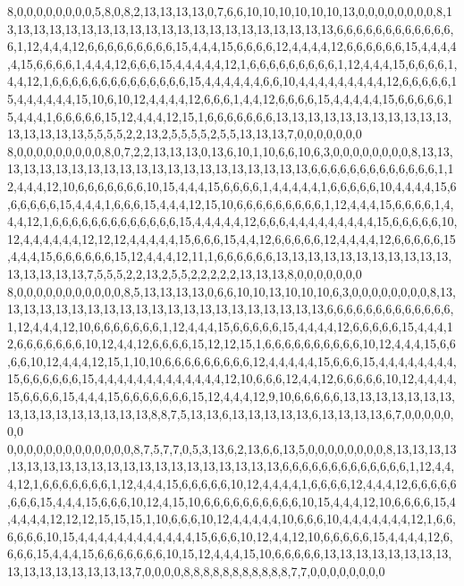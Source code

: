 8,0,0,0,0,0,0,0,0,5,8,0,8,2,13,13,13,13,0,7,6,6,10,10,10,10,10,10,13,0,0,0,0,0,0,0,0,8,13,13,13,13,13,13,13,13,13,13,13,13,13,13,13,13,13,13,13,13,13,6,6,6,6,6,6,6,6,6,6,6,6,6,1,12,4,4,4,12,6,6,6,6,6,6,6,6,6,15,4,4,4,15,6,6,6,6,12,4,4,4,4,12,6,6,6,6,6,6,15,4,4,4,4,4,15,6,6,6,6,1,4,4,4,12,6,6,6,15,4,4,4,4,4,12,1,6,6,6,6,6,6,6,6,6,1,12,4,4,4,15,6,6,6,6,1,4,4,12,1,6,6,6,6,6,6,6,6,6,6,6,6,6,6,15,4,4,4,4,4,4,6,6,10,4,4,4,4,4,4,4,4,4,12,6,6,6,6,6,15,4,4,4,4,4,4,15,10,6,10,12,4,4,4,4,12,6,6,6,1,4,4,12,6,6,6,6,15,4,4,4,4,4,15,6,6,6,6,6,15,4,4,4,1,6,6,6,6,6,15,12,4,4,4,12,15,1,6,6,6,6,6,6,6,13,13,13,13,13,13,13,13,13,13,13,13,13,13,13,13,5,5,5,5,2,2,13,2,5,5,5,5,2,5,5,13,13,13,7,0,0,0,0,0,0,0
8,0,0,0,0,0,0,0,0,0,8,0,7,2,2,13,13,13,0,13,6,10,1,10,6,6,10,6,3,0,0,0,0,0,0,0,0,8,13,13,13,13,13,13,13,13,13,13,13,13,13,13,13,13,13,13,13,13,13,6,6,6,6,6,6,6,6,6,6,6,6,6,1,12,4,4,4,12,10,6,6,6,6,6,6,6,10,15,4,4,4,15,6,6,6,6,1,4,4,4,4,4,1,6,6,6,6,6,10,4,4,4,4,15,6,6,6,6,6,6,15,4,4,4,1,6,6,6,15,4,4,4,12,15,10,6,6,6,6,6,6,6,6,6,1,12,4,4,4,15,6,6,6,6,1,4,4,4,12,1,6,6,6,6,6,6,6,6,6,6,6,6,6,15,4,4,4,4,4,12,6,6,6,4,4,4,4,4,4,4,4,4,15,6,6,6,6,6,10,12,4,4,4,4,4,4,12,12,12,4,4,4,4,4,15,6,6,6,15,4,4,12,6,6,6,6,6,12,4,4,4,4,12,6,6,6,6,6,15,4,4,4,15,6,6,6,6,6,6,15,12,4,4,4,12,11,1,6,6,6,6,6,6,13,13,13,13,13,13,13,13,13,13,13,13,13,13,13,13,7,5,5,5,2,2,13,2,5,5,2,2,2,2,2,13,13,13,8,0,0,0,0,0,0,0
8,0,0,0,0,0,0,0,0,0,0,0,8,5,13,13,13,13,0,6,6,10,10,13,10,10,10,6,3,0,0,0,0,0,0,0,0,8,13,13,13,13,13,13,13,13,13,13,13,13,13,13,13,13,13,13,13,13,13,6,6,6,6,6,6,6,6,6,6,6,6,6,1,12,4,4,4,12,10,6,6,6,6,6,6,6,1,12,4,4,4,15,6,6,6,6,6,15,4,4,4,4,12,6,6,6,6,6,15,4,4,4,12,6,6,6,6,6,6,6,10,12,4,4,12,6,6,6,6,15,12,12,15,1,6,6,6,6,6,6,6,6,6,6,10,12,4,4,4,15,6,6,6,6,10,12,4,4,4,12,15,1,10,10,6,6,6,6,6,6,6,6,6,12,4,4,4,4,4,15,6,6,6,15,4,4,4,4,4,4,4,4,15,6,6,6,6,6,6,15,4,4,4,4,4,4,4,4,4,4,4,4,4,12,10,6,6,6,12,4,4,12,6,6,6,6,6,10,12,4,4,4,4,15,6,6,6,6,15,4,4,4,15,6,6,6,6,6,6,6,15,12,4,4,4,12,9,10,6,6,6,6,6,13,13,13,13,13,13,13,13,13,13,13,13,13,13,13,13,8,8,7,5,13,13,6,13,13,13,13,13,6,13,13,13,13,6,7,0,0,0,0,0,0,0
0,0,0,0,0,0,0,0,0,0,0,0,0,8,7,5,7,7,0,5,3,13,6,2,13,6,6,13,5,0,0,0,0,0,0,0,0,8,13,13,13,13,13,13,13,13,13,13,13,13,13,13,13,13,13,13,13,13,13,6,6,6,6,6,6,6,6,6,6,6,6,6,1,12,4,4,4,12,1,6,6,6,6,6,6,6,1,12,4,4,4,15,6,6,6,6,6,10,12,4,4,4,4,1,6,6,6,6,12,4,4,4,12,6,6,6,6,6,6,6,6,15,4,4,4,15,6,6,6,10,12,4,15,10,6,6,6,6,6,6,6,6,6,6,10,15,4,4,4,12,10,6,6,6,6,15,4,4,4,4,4,12,12,12,15,15,15,1,10,6,6,6,10,12,4,4,4,4,4,10,6,6,6,10,4,4,4,4,4,4,4,12,1,6,6,6,6,6,6,10,15,4,4,4,4,4,4,4,4,4,4,4,4,15,6,6,6,10,12,4,4,12,10,6,6,6,6,6,15,4,4,4,4,12,6,6,6,6,15,4,4,4,15,6,6,6,6,6,6,6,10,15,12,4,4,4,15,10,6,6,6,6,6,13,13,13,13,13,13,13,13,13,13,13,13,13,13,13,13,7,0,0,0,0,8,8,8,8,8,8,8,8,8,8,8,7,7,0,0,0,0,0,0,0,0
